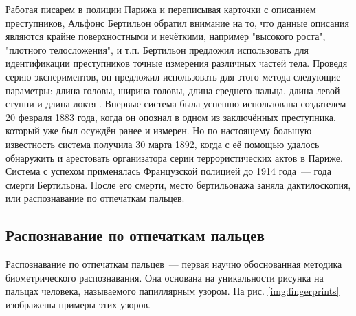 \documentclass[14pt, a4paper]{extarticle}
\begin{document}
Работая писарем в полиции Парижа и переписывая карточки с описанием преступников, Альфонс Бертильон обратил внимание на то, что данные описания являются крайне поверхностными и нечёткими, например "высокого роста", "плотного телосложения", и т.п. Бертильон предложил использовать для идентификации преступников точные измерения различных частей тела. Проведя серию экспериментов, он предложил использовать для этого метода следующие параметры: длина головы, ширина головы, длина среднего пальца, длина левой ступни и длина локтя \cite{bertillon}. Впервые система была успешно использована создателем 20 февраля 1883 года, когда он опознал в одном из заключённых преступника, который уже был осуждён ранее и измерен. Но по настоящему большую известность система получила 30 марта 1892, когда с её помощью удалось обнаружить и арестовать организатора серии террористических актов в Париже.
Система с успехом применялась Французской полицией до 1914 года~--- года смерти Бертильона. После его смерти, место бертильонажа заняла дактилоскопия, или распознавание по отпечаткам пальцев.
\subsection{Распознавание по отпечаткам пальцев}
Распознавание по отпечаткам пальцев~--- первая научно обоснованная методика биометрического распознавания. Она основана на уникальности рисунка на пальцах человека, называемого папиллярным узором. На рис. \ref{img:fingerprints} изображены примеры этих узоров.
\end{document}
